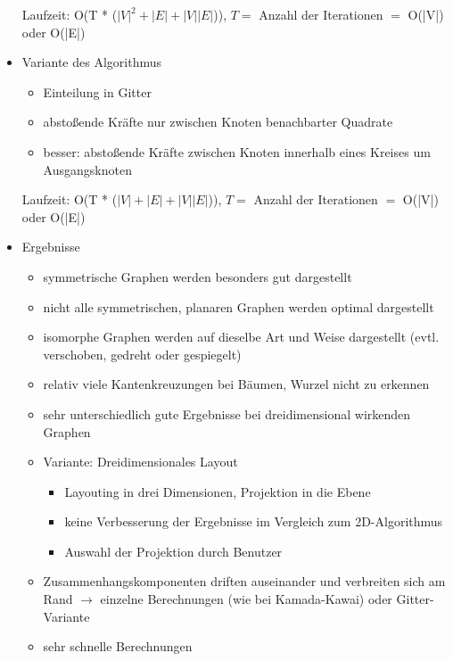 \documentclass[a4paper,12pt,ngerman]{scrartcl}
\begin{document}
\begin{itemize}
    Laufzeit: O(T * ($|V|^2 + |E| + |V||E|$)), $T =$ Anzahl der Iterationen $=$ O(|V|) oder O(|E|)

    \item Variante des Algorithmus
    \begin{itemize}
        \item Einteilung in Gitter
        \item abstoßende Kräfte nur zwischen Knoten benachbarter Quadrate
        \item besser: abstoßende Kräfte zwischen Knoten innerhalb eines Kreises um Ausgangsknoten
    \end{itemize}

    Laufzeit: O(T * ($|V| + |E| + |V||E|$)), $T =$ Anzahl der Iterationen $=$ O(|V|) oder O(|E|)
    \item Ergebnisse
    \begin{itemize}
        \item symmetrische Graphen werden besonders gut dargestellt
        \item nicht alle symmetrischen, planaren Graphen werden optimal dargestellt
        \item isomorphe Graphen werden auf dieselbe Art und Weise dargestellt (evtl. verschoben, gedreht oder gespiegelt)
        \item relativ viele Kantenkreuzungen bei Bäumen, Wurzel nicht zu erkennen
        \item sehr unterschiedlich gute Ergebnisse bei dreidimensional wirkenden Graphen
        \item Variante: Dreidimensionales Layout
    \begin{itemize}
        \item Layouting in drei Dimensionen, Projektion in die Ebene
        \item keine Verbesserung der Ergebnisse im Vergleich zum 2D-Algorithmus
        \item Auswahl der Projektion durch Benutzer
    \end{itemize}
    \item Zusammenhangskomponenten driften auseinander und verbreiten sich am Rand $\rightarrow$ einzelne Berechnungen (wie bei Kamada-Kawai) oder Gitter-Variante
    \item sehr schnelle Berechnungen
    \end{itemize}
\end{itemize}
\end{document}
